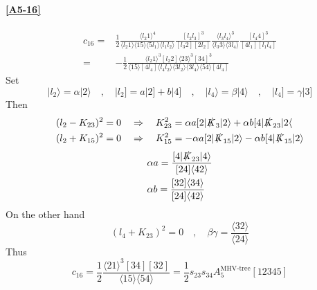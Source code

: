 \paragraph{\ref{A5-16}}
\begin{equation*}
\begin{split}
c_{16} = & \frac{1}{2}
\frac{\langle l_2 1 \rangle^4}{\langle l_2 1 \rangle\langle 15 \rangle\langle 5 l_1 \rangle\langle l_1 l_2\rangle}
\frac{[l_2 l_3]^3}{[l_3 2 ][2 l_2]}
\frac{\langle l_3 l_4\rangle^3}{\langle l_3 3\rangle\langle 3 l_4\rangle}
\frac{[l_4 4 ]^3}{[4l_1][l_1l_4]}
\\
= & 
-\frac{1}{2}\frac{\langle l_2 1\rangle^3[l_2 2 ]\langle 23 \rangle^3[34]^3}{\langle 15 \rangle[4l_4]\langle l_4 l_2\rangle\langle 3l_2\rangle \langle 3 l_4\rangle\langle 54\rangle[4l_4]}
\end{split}
\end{equation*}
Set
\begin{equation*}
|l_2\rangle = \alpha|2\rangle \quad,\quad
|l_2] = a|2] + b|4] \quad,\quad
|l_4\rangle = \beta |4\rangle \quad,\quad
|l_4] = \gamma|3]
\end{equation*}
Then
\begin{equation*}
\begin{split}
& (l_2 - K_{23})^2 = 0 \quad\Rightarrow\quad K_{23}^2 = \alpha a [2|\slashed{K}_3|2\rangle + \alpha b [4|\slashed{K}_{23}|2\langle
\\
& (l_2 + K_{15})^2 = 0 \quad\Rightarrow\quad K_{15}^2 = -\alpha a [2|\slashed{K}_{15}|2\rangle - \alpha b [4|\slashed{K}_{15}|2\rangle
\end{split}
\end{equation*}
\begin{equation*}
\begin{split}
& \alpha a = \frac{[4|\slashed{K}_{23}|4\rangle}{[24]\langle 42\rangle}
\\
& \alpha b = \frac{[32]\langle 34\rangle}{[24]\langle 42\rangle}
\end{split}
\end{equation*}
On the other hand
\begin{equation*}
(l_4 + K_{23})^2 = 0 \quad,\quad \beta\gamma = \frac{\langle 32\rangle}{\langle 24\rangle}
\end{equation*}
Thus
\begin{equation*}
c_{16}= \frac{1}{2}\frac{\langle 21\rangle^3[34][32]}{\langle 15\rangle\langle 54\rangle} = \frac{1}{2}s_{23}s_{34}A_5^{\textrm{MHV-tree}}[12345]
\end{equation*}
%
%
%
